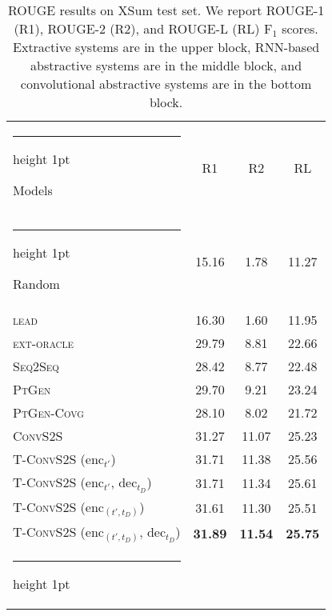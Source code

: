 \documentclass[11pt,a4paper]{article}
\makeatletter
\newcommand{\thickhline}{\noalign {\ifnum 0=`}\fi \hrule height 1pt
    \futurelet \reserved@a \@xhline
}
\makeatother
\begin{document}
\begin{table}[t]
  \begin{center}{\fontsize{8.5}{11}\selectfont \begin{tabular}{ l | c c c }
    \thickhline
    Models & R1 & R2 & RL \\ \thickhline
Random & 15.16 & 1.78 & 11.27 \\ 
    \textsc{lead} & 16.30 & 1.60 & 11.95 \\ 
    \textsc{ext-oracle} & 29.79 & 8.81 & 22.66 \\ \hline
    \textsc{Seq2Seq} &  28.42 & 8.77 &  22.48 \\
    \textsc{PtGen} & 29.70 & 9.21 & 23.24 \\ 
    \textsc{PtGen-Covg} & 28.10 & 8.02 & 21.72 \\ 
\hline
    \textsc{ConvS2S} & 31.27 & 11.07 & 25.23 \\  \textsc{T-ConvS2S} (enc$_{t'}$) & 31.71 & 11.38 & 25.56 \\
    \textsc{T-ConvS2S} (enc$_{t'}$, dec$_{t_D}$) & 31.71 & 11.34 & 25.61 \\
    \textsc{T-ConvS2S} (enc$_{(t',t_D)}$) & 31.61 & 11.30 & 25.51 \\
    \textsc{T-ConvS2S} (enc$_{(t',t_D)}$, dec$_{t_D}$)  & \textbf{31.89} & \textbf{11.54} & \textbf{25.75} \\ \thickhline 

\end{tabular}
  }\end{center}
\caption{ROUGE results on  XSum test set. We report \mbox{ROUGE-1} (R1), ROUGE-2
  (R2), and ROUGE-L (RL) F$_1$  scores. Extractive systems are in the
  upper block, RNN-based   abstractive systems are in the middle block,
  and convolutional    abstractive systems are in the bottom
  block. \label{tab:rouge}} 
\end{table}
\end{document}
